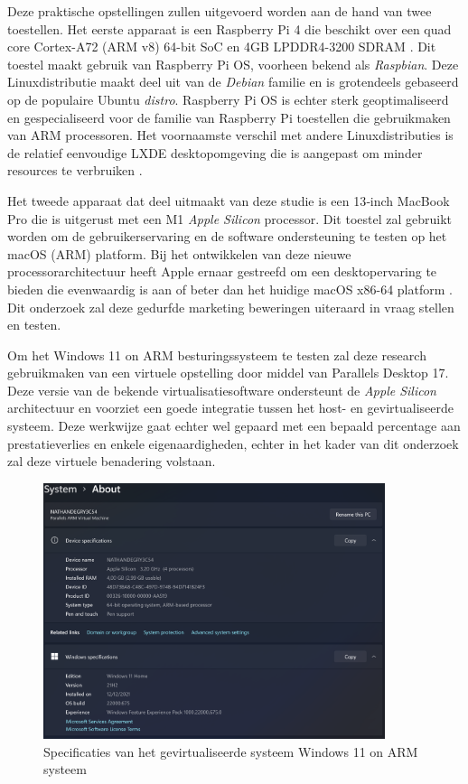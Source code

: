 Deze praktische opstellingen zullen uitgevoerd worden aan de hand van twee toestellen. Het eerste apparaat is een Raspberry Pi 4 die beschikt over een quad core Cortex-A72 (ARM v8) 64-bit SoC en 4GB LPDDR4-3200 SDRAM \autocite{Pi2021}. Dit toestel maakt gebruik van Raspberry Pi OS, voorheen bekend als \textit{Raspbian}. Deze Linuxdistributie maakt deel uit van de \textit{Debian} familie en is grotendeels gebaseerd op de populaire Ubuntu \textit{distro}. Raspberry Pi OS is echter sterk geoptimaliseerd en gespecialiseerd voor de familie van Raspberry Pi toestellen die gebruikmaken van ARM processoren. Het voornaamste verschil met andere Linuxdistributies is de relatief eenvoudige LXDE desktopomgeving die is aangepast om minder resources te verbruiken \autocite{Pi2011}.

Het tweede apparaat dat deel uitmaakt van deze studie is een 13‑inch MacBook Pro die is uitgerust met een M1 \textit{Apple Silicon} processor. Dit toestel zal gebruikt worden om de gebruikerservaring en de software ondersteuning te testen op het macOS (ARM) platform. Bij het ontwikkelen van deze nieuwe processorarchitectuur heeft Apple ernaar gestreefd om een desktopervaring te bieden die evenwaardig is aan of beter dan het huidige macOS x86-64 platform \autocite{Apple2020}. Dit onderzoek zal deze gedurfde marketing beweringen uiteraard in vraag stellen en testen.

Om het Windows 11 on ARM besturingssysteem te testen zal deze research gebruikmaken van een virtuele opstelling door middel van Parallels Desktop 17. Deze versie van de bekende virtualisatiesoftware ondersteunt de \textit{Apple Silicon} architectuur en voorziet een goede integratie tussen het host- en gevirtualiseerde systeem. Deze werkwijze gaat echter wel gepaard met een bepaald percentage aan prestatieverlies en enkele eigenaardigheden, echter in het kader van dit onderzoek zal deze virtuele benadering volstaan.

\begin{figure}[h]
	\centering
	\includegraphics[width=100mm, scale=0.5]{img/specificaties_winARM.png}
	\caption{Specificaties van het gevirtualiseerde systeem Windows 11 on ARM systeem}
	\end{figure}

